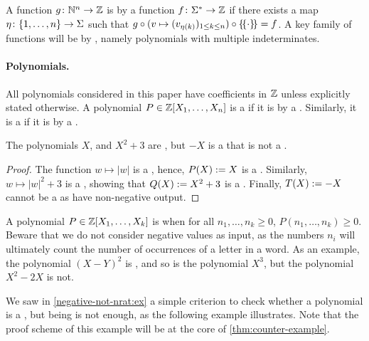 \AP A function $g \colon \mathbb{N}^n \to \mathbb{Z}$ is  by a function
$f \colon \Sigma^* \to \mathbb{Z}$ if there exists a map $\eta \colon \mathopen{\{} 1, \dots,
n \mathclose{\}} \to \Sigma$ such that $g \circ (v \mapsto \seqof{v_{\eta(k)}}{1 \leq k \leq
n}) \circ \commute = f$. A key family of functions will be  by
, namely polynomials with multiple indeterminates.

\AP \paragraph*{Polynomials.} All polynomials considered in this paper have
coefficients in $\mathbb{Z}$ unless explicitly stated otherwise. A polynomial $P \in
\mathbb{Z}[X_1, \dots, X_n]$ is a  if it
is  by a . Similarly, it is a
 if it is  by a
. 

\begin{example}
    \label{negative-not-nrat:ex}
    The polynomials $X$, and $X^2 + 3$ are ,
    but $- X$ is a  that is 
    not a .
\end{example}
\begin{proof}
    The function $w \mapsto |w|$ is a ,
    hence, $P(X) \mathrel{:=} X$ is
    a . Similarly,
    $w \mapsto |w|^2 + 3$ is a ,
    showing that $Q(X) \mathrel{:=} X^2 + 3$
    is a .
    Finally, 
    $T(X) \mathrel{:=} - X$ cannot be 
    a  as 
    have non-negative output.
\end{proof}

\AP A polynomial $P \in \mathbb{Z}[X_1, \dots, X_k]$ is  when for
all $n_1, \dots, n_k \geq 0$, $P(n_1, \dots, n_k) \geq 0$. Beware that we do
not consider negative values as input, as the numbers $n_i$ will ultimately
count the number of occurrences of a letter in a word. As an example, the
polynomial $(X - Y)^2$ is , and so is the polynomial $X^3$,
but the polynomial $X^2 - 2X$ is not.

We saw in \cref{negative-not-nrat:ex} a simple criterion to check whether a
polynomial is a , but being  is
not enough, as the following example illustrates. Note that the proof scheme of
this example will be at the core of \cref{thm:counter-example}.

